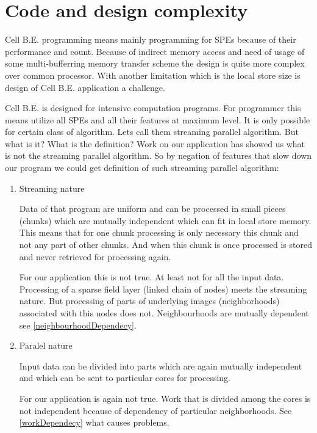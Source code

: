 \section{Code and design complexity}

\par
Cell B.E. programming means mainly programming for SPEs because of their performance and count.
Because of indirect memory access and need of usage of some multi-bufferring memory transfer scheme the design is quite more complex over common processor.
With another limitation which is the local store size is design of Cell B.E. application a challenge.

\par
Cell B.E. is designed for intensive computation programs.
For programmer this means utilize all SPEs and all their features at maximum level.
It is only possible for certain class of algorithm.
Lets call them streaming parallel algorithm.
But what is it? What is the definition?
Work on our application has showed us what is not the streaming parallel algorithm.
So by negation of features that slow down our program we could get definition of such streaming parallel algorithm:
\begin{enumerate}

\item{Streaming nature}
\par
Data of that program are uniform and can be processed in small pieces (chunks) which are mutually independent which can fit in local store memory.
This means that for one chunk processing is only necessary this chunk and not any part of other chunks.
And when this chunk is once processed is stored and never retrieved for processing again.

\par
For our application this is not true.
At least not for all the input data.
Processing of a sparse field layer (linked chain of nodes) meets the streaming nature.
But processing of parts of underlying images (neighborhoods) associated with this nodes does not.
Neighbourhoods are mutually dependent see \ref{neighbourhoodDependecy}.

\item{Paralel nature}
\par
Input data can be divided into parts which are again mutually independent and which can be sent to particular cores for processing.

\par
For our application is again not true.
Work that is divided among the cores is not independent because of dependency of particular neighborhoods.
See \ref{workDependecy} what causes problems.

\end{enumerate}

